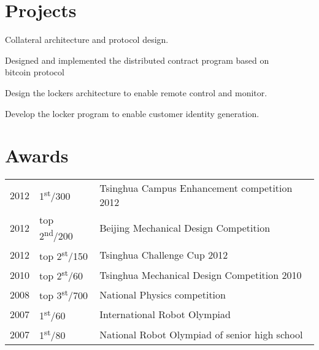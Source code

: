 \documentclass[]{deedy-resume}
\begin{document}
\begin{minipage}[t]{0.66\textwidth}
\section{Projects}
\begin{tightemize}
\item Collateral architecture and protocol design.
\item Designed and implemented the distributed contract program based on\\  \hspace{-.6cm} bitcoin protocol
\end{tightemize}
\sectionsep

\begin{tightemize}
\item Design the lockers architecture to enable remote control and monitor.
\item Develop the locker program to enable customer identity generation.
\end{tightemize}

\sectionsep


\section{Awards}
\begin{tabular}{rll}
2012	 & 1\textsuperscript{st}/300  & Tsinghua Campus Enhancement competition 2012\\
2012	 & top 2\textsuperscript{nd}/200  & Beijing Mechanical Design Competition\\
2012	 & top 2\textsuperscript{st}/150  & Tsinghua Challenge Cup 2012\\
2010	 & top 2\textsuperscript{st}/60   & Tsinghua Mechanical Design Competition 2010\\
2008	 & top 3\textsuperscript{st}/700  & National Physics competition\\
2007	 & 1\textsuperscript{st}/60       & International Robot Olympiad\\
2007 	 & 1\textsuperscript{st}/80 	  & National Robot Olympiad of senior high school\\
\end{tabular}
\sectionsep

\end{minipage}
\end{document}

